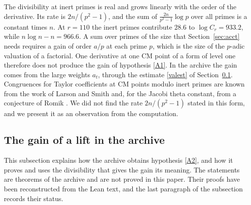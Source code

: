 \documentclass[11pt,letterpaper]{article}
\numberwithin{equation}{section}
\begin{document}
The divisibility at inert primes is real and grows linearly with the order of the derivative. Its rate is $2n/(p^2-1)$, and the sum of $\frac{2n}{p^2-1}\log p$ over all primes is a constant times $n$. At $r=110$ the inert primes contribute $28.6$ to $\log C_r=933.2$, while $n\log n-n=966.6$. A sum over primes of the size that Section~\ref{sec:acct} needs requires a gain of order $a/p$ at each prime $p$, which is the size of the $p$-adic valuation of a factorial. One derivative at one CM point of a form of level one therefore does not produce the gain of hypothesis \eqref{A1}. In the archive the gain comes from the large weights $a_t$, through the estimate \eqref{valest} of Section~\ref{sec:gainmech}. Congruences for Taylor coefficients at CM points modulo inert primes are known from the work of Larson and Smith \cite{larsonsmith} and, for the Jacobi theta constant, from a conjecture of Romik \cite{romik}. We did not find the rate $2n/(p^2-1)$ stated in this form, and we present it as an observation from the computation.

\subsection{The gain of a lift in the archive}\label{sec:gainmech}

This subsection explains how the archive obtains hypothesis \eqref{A2}, and how it proves and uses the divisibility that gives the gain its meaning. The statements are theorems of the archive and are not proved in this paper. Their proofs have been reconstructed from the Lean text, and the last paragraph of the subsection records their status.
\end{document}

